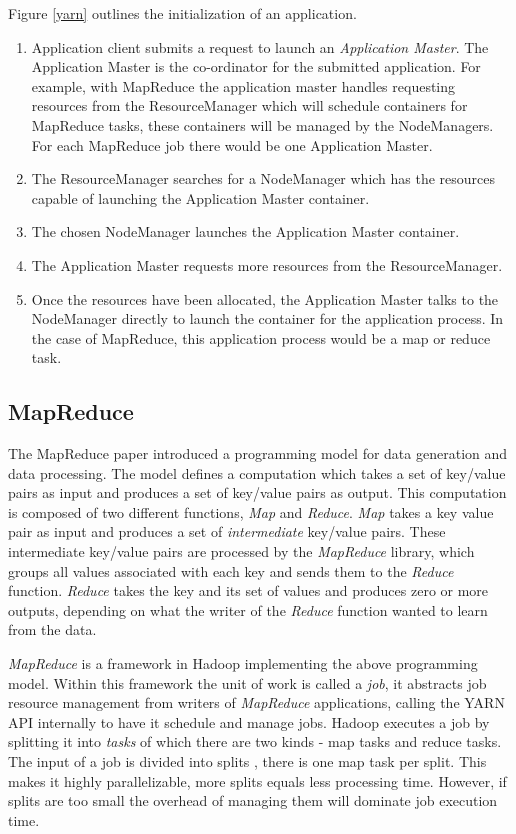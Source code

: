 \documentclass[conference]{IEEEtran}
\begin{document}
Figure \ref{yarn} outlines the initialization of an application.

\begin{enumerate}
\item Application client submits a request to launch an \emph{Application Master}. The Application Master is the co-ordinator for the submitted application. For example, with MapReduce the application master handles requesting resources from the ResourceManager which will schedule containers for MapReduce tasks, these containers will be managed by the NodeManagers. For each MapReduce job there would be one Application Master.
\item The ResourceManager searches for a NodeManager which has the resources capable of launching the Application Master container.
\item The chosen NodeManager launches the Application Master container.
\item The Application Master requests more resources from the ResourceManager.
\item Once the resources have been allocated, the Application Master talks to the NodeManager directly to launch the container for the application process. In the case of MapReduce, this application process would be a map or reduce task.
\end{enumerate}

\subsection{MapReduce}
The MapReduce paper \cite{mapreduce} introduced a programming model for data generation and data processing. The model defines a computation which takes a set of key/value pairs as input and produces a set of key/value pairs as output.
This computation is composed of two different functions, \emph{Map} and \emph{Reduce}. \emph{Map} takes a key value pair as input and produces a set of \emph{intermediate} key/value pairs. These intermediate key/value pairs are processed by the \emph{MapReduce} library, which groups all values associated with each key and sends them to the \emph{Reduce} function. \emph{Reduce} takes the key and its set of values and produces zero or more outputs, depending on what the writer of the \emph{Reduce} function wanted to learn from the data.

\emph{MapReduce} is a framework in Hadoop implementing the above programming model. Within this framework the unit of work is called a \emph{job}, it abstracts job resource management from writers of \emph{MapReduce} applications, calling the YARN API internally to have it schedule and manage jobs. Hadoop executes a job by splitting it into \emph{tasks} of which there are two kinds - map tasks and reduce tasks. The input of a job is divided into splits \cite{mapreduce}, there is one map task per split. This makes it highly parallelizable, more splits equals less processing time. However, if splits are too small the overhead of managing them will dominate job execution time.
\end{document}
